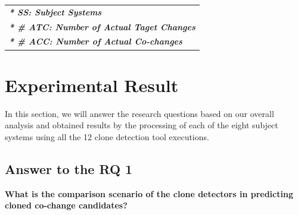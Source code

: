 \documentclass[review]{elsarticle}
\begin{document}
\begin{table}[]
\begin{tabular}{lcccc}
\multicolumn{5}{l}{\textit{\textbf{* SS: Subject Systems}}}                                                                                                                                         \\
\multicolumn{5}{l}{\textit{\textbf{* \# ATC: Number of   Actual Taget Changes}}}                                                                                                                    \\
\multicolumn{5}{l}{\textit{\textbf{* \# ACC: Number of   Actual Co-changes}}}                                                                                                                      
\end{tabular}
\end{table}

\section{Experimental Result}
\label{the-experimental-result}
In this section, we will answer the research questions based on our overall analysis and obtained results by the processing of each of the eight subject systems using all the 12 clone detection tool executions. 

\subsection{Answer to the \textbf{RQ 1}}
\textbf{What is the comparison scenario of the clone detectors in predicting cloned co-change candidates?}\\
\end{document}
